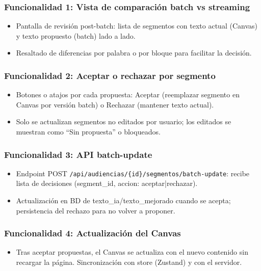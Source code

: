 \documentclass[12pt,a4paper]{report}
\begin{document}
\subsubsection{Funcionalidad 1: Vista de comparación batch vs streaming}

\begin{itemize}
    \item Pantalla de revisión post-batch: lista de segmentos con texto actual (Canvas) y texto propuesto (batch) lado a lado.
    \item Resaltado de diferencias por palabra o por bloque para facilitar la decisión.
\end{itemize}

\subsubsection{Funcionalidad 2: Aceptar o rechazar por segmento}

\begin{itemize}
    \item Botones o atajos por cada propuesta: Aceptar (reemplazar segmento en Canvas por versión batch) o Rechazar (mantener texto actual).
    \item Solo se actualizan segmentos no editados por usuario; los editados se muestran como ``Sin propuesta'' o bloqueados.
\end{itemize}

\subsubsection{Funcionalidad 3: API batch-update}

\begin{itemize}
    \item Endpoint POST \texttt{/api/audiencias/\{id\}/segmentos/batch-update}: recibe lista de decisiones (segment\_id, accion: aceptar|rechazar).
    \item Actualización en BD de texto\_ia/texto\_mejorado cuando se acepta; persistencia del rechazo para no volver a proponer.
\end{itemize}

\subsubsection{Funcionalidad 4: Actualización del Canvas}

\begin{itemize}
    \item Tras aceptar propuestas, el Canvas se actualiza con el nuevo contenido sin recargar la página. Sincronización con store (Zustand) y con el servidor.
\end{itemize}
\end{document}
